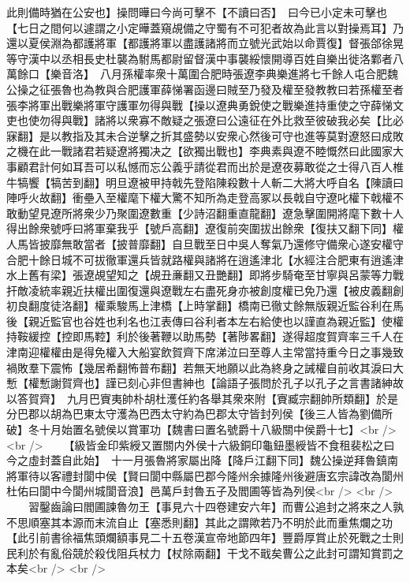 此則備時猶在公安也】操問曄曰今尚可擊不【不讀曰否】　曰今已小定未可擊也【七日之間何以遽謂之小定曄蓋窺覘備之守蜀有不可犯者故為此言以對操焉耳】乃還以夏侯淵為都護將軍【都護將軍以盡護諸將而立號光武始以命賈復】督張郃徐晃等守漢中以丞相長史杜襲為駙馬都尉留督漢中事襲綏懷開導百姓自樂出徙洛鄴者八萬餘口【樂音洛】　八月孫權率衆十萬圍合肥時張遼李典樂進將七千餘人屯合肥魏公操之征張魯也為教與合肥護軍薛悌署函邊曰賊至乃發及權至發教教曰若孫權至者張李將軍出戰樂將軍守護軍勿得與戰【操以遼典勇銳使之戰樂進持重使之守薛悌文吏也使勿得與戰】諸將以衆寡不敵疑之張遼曰公遠征在外比救至彼破我必矣【比必寐翻】是以教指及其未合逆擊之折其盛勢以安衆心然後可守也進等莫對遼怒曰成敗之機在此一戰諸君若疑遼將獨决之【欲獨出戰也】李典素與遼不睦慨然曰此國家大事顧君計何如耳吾可以私憾而忘公義乎請從君而出於是遼夜募敢從之士得八百人椎牛犒饗【犒苦到翻】明旦遼被甲持戟先登陷陳殺數十人斬二大將大呼自名【陳讀曰陣呼火故翻】衝壘入至權麾下權大驚不知所為走登高冢以長戟自守遼叱權下戟權不敢動望見遼所將衆少乃聚圍遼數重【少詩沼翻重直龍翻】遼急擊圍開將麾下數十人得出餘衆號呼曰將軍棄我乎【號戶高翻】遼復前突圍拔出餘衆【復扶又翻下同】權人馬皆披靡無敢當者【披普靡翻】自旦戰至日中吳人奪氣乃還修守備衆心遂安權守合肥十餘日城不可拔徹軍還兵皆就路權與諸將在逍遙津北【水經注合肥東有逍遙津水上舊有梁】張遼覘望知之【覘丑亷翻又丑艷翻】即將步騎奄至甘寧與呂蒙等力戰扞敵凌統率親近扶權出圍復還與遼戰左右盡死身亦被創度權已免乃還【被皮義翻創初良翻度徒洛翻】權乘駿馬上津橋【上時掌翻】橋南已徹丈餘無版親近監谷利在馬後【親近監官也谷姓也利名也江表傳曰谷利者本左右給使也以謹直為親近監】使權持鞍緩控【控即馬鞚】利於後著鞭以助馬勢【著陟畧翻】遂得超度賀齊率三千人在津南迎權權由是得免權入大船宴飲賀齊下席涕泣曰至尊人主常當持重今日之事幾致禍敗羣下震怖【幾居希翻怖普布翻】若無天地願以此為終身之誡權自前收其淚曰大慙【權慙謝賀齊也】謹已刻心非但書紳也【論語子張問於孔子以孔子之言書諸紳故以答賀齊】　九月巴賨夷帥朴胡杜濩任約各舉其衆來附【賨臧宗翻帥所類翻】於是分巴郡以胡為巴東太守濩為巴西太守約為巴郡太守皆封列侯【後三人皆為劉備所破】冬十月始置名號侯以賞軍功【魏書曰置名號爵十八級關中侯爵十七】<br />
<br />
　　【級皆金印紫綬又置關内外侯十六級銅印龜鈕墨綬皆不食租裴松之曰今之虛封蓋自此始】　十一月張魯將家屬出降【降戶江翻下同】魏公操逆拜魯鎮南將軍待以客禮封閬中侯【賢曰閬中縣屬巴郡今隆州余據隆州後避唐玄宗諱改為閬州杜佑曰閬中今閬州城閬音浪】邑萬戶封魯五子及閻圃等皆為列侯<br />
<br />
　　習鑿齒論曰閻圃諫魯勿王【事見六十四卷建安六年】而曹公追封之將來之人孰不思順塞其本源而末流自止【塞悉則翻】其此之謂歟若乃不明於此而重焦爛之功【此引前書徐福焦頭爛額事見二十五卷漢宣帝地節四年】豐爵厚賞止於死戰之士則民利於有亂俗競於殺伐阻兵杖力【杖除兩翻】干戈不戢矣曹公之此封可謂知賞罰之本矣<br />
<br />
